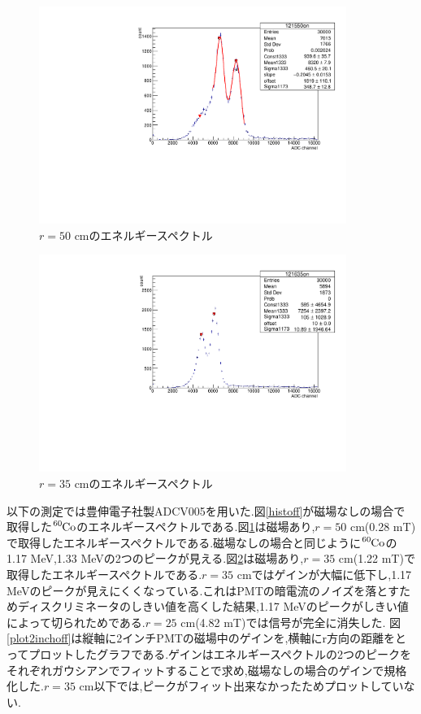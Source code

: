 \begin{figure}[tbp]
	\centering
	\includegraphics[angle=-90,width=10cm]{fig/iguchi/121550on.pdf}
	\caption{$r=50$ cmのエネルギースペクトル}
	\label{hist50}
\end{figure}

\begin{figure}[tbp]
	\centering
	\includegraphics[angle=-90,width=10cm]{fig/iguchi/121635on.pdf}
	\caption{$r=35$ cmのエネルギースペクトル}
	\label{hist35}
\end{figure}

以下の測定では豊伸電子社製ADC\hspace{3pt}V005を用いた.図\ref{histoff}が磁場なしの場合で取得した$\ce{^{60}Co}$のエネルギースペクトルである.図\ref{hist50}は磁場あり,$r=50$ cm(0.28 mT)で取得したエネルギースペクトルである.磁場なしの場合と同じように$\ce{^{60}Co}$の1.17 MeV,1.33 MeVの2つのピークが見える.図\ref{hist35}は磁場あり,$r=35$ cm(1.22 mT)で取得したエネルギースペクトルである.$r=35$ cmではゲインが大幅に低下し,1.17 MeVのピークが見えにくくなっている.これはPMTの暗電流のノイズを落とすためディスクリミネータのしきい値を高くした結果,1.17 MeVのピークがしきい値によって切られためである.$r=25$ cm(4.82 mT)では信号が完全に消失した.
図\ref{plot2inchoff}は縦軸に2インチPMTの磁場中のゲインを,横軸にr方向の距離をとってプロットしたグラフである.ゲインはエネルギースペクトルの2つのピークをそれぞれガウシアンでフィットすることで求め,磁場なしの場合のゲインで規格化した.$r=35$ cm以下では,ピークがフィット出来なかったためプロットしていない.

